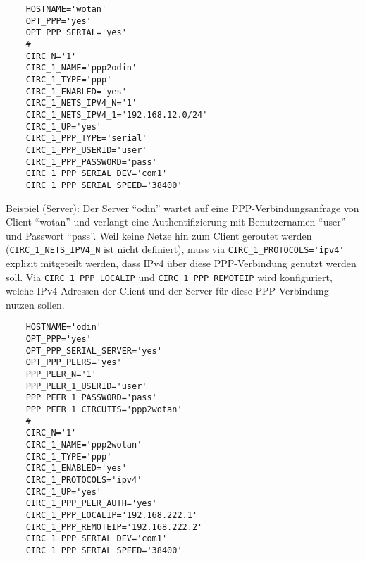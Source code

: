 \begin{example}
\begin{verbatim}
    HOSTNAME='wotan'
    OPT_PPP='yes'
    OPT_PPP_SERIAL='yes'
    #
    CIRC_N='1'
    CIRC_1_NAME='ppp2odin'
    CIRC_1_TYPE='ppp'
    CIRC_1_ENABLED='yes'
    CIRC_1_NETS_IPV4_N='1'
    CIRC_1_NETS_IPV4_1='192.168.12.0/24'
    CIRC_1_UP='yes'
    CIRC_1_PPP_TYPE='serial'
    CIRC_1_PPP_USERID='user'
    CIRC_1_PPP_PASSWORD='pass'
    CIRC_1_PPP_SERIAL_DEV='com1'
    CIRC_1_PPP_SERIAL_SPEED='38400'
\end{verbatim}
\end{example}

Beispiel (Server): Der Server ``odin'' wartet auf eine PPP-Verbindungsanfrage
von Client ``wotan'' und verlangt eine Authentifizierung mit Benutzernamen
``user'' und Passwort ``pass''. Weil keine Netze hin zum Client geroutet werden
(\verb+CIRC_1_NETS_IPV4_N+ ist nicht definiert), muss via
\verb+CIRC_1_PROTOCOLS='ipv4'+ explizit mitgeteilt werden, dass IPv4 über diese
PPP-Verbindung genutzt werden soll.  Via \verb+CIRC_1_PPP_LOCALIP+ und
\verb+CIRC_1_PPP_REMOTEIP+ wird konfiguriert, welche IPv4-Adressen der Client
und der Server für diese PPP-Verbindung nutzen sollen.

\begin{example}
\begin{verbatim}
    HOSTNAME='odin'
    OPT_PPP='yes'
    OPT_PPP_SERIAL_SERVER='yes'
    OPT_PPP_PEERS='yes'
    PPP_PEER_N='1'
    PPP_PEER_1_USERID='user'
    PPP_PEER_1_PASSWORD='pass'
    PPP_PEER_1_CIRCUITS='ppp2wotan'
    #
    CIRC_N='1'
    CIRC_1_NAME='ppp2wotan'
    CIRC_1_TYPE='ppp'
    CIRC_1_ENABLED='yes'
    CIRC_1_PROTOCOLS='ipv4'
    CIRC_1_UP='yes'
    CIRC_1_PPP_PEER_AUTH='yes'
    CIRC_1_PPP_LOCALIP='192.168.222.1'
    CIRC_1_PPP_REMOTEIP='192.168.222.2'
    CIRC_1_PPP_SERIAL_DEV='com1'
    CIRC_1_PPP_SERIAL_SPEED='38400'
\end{verbatim}
\end{example}
